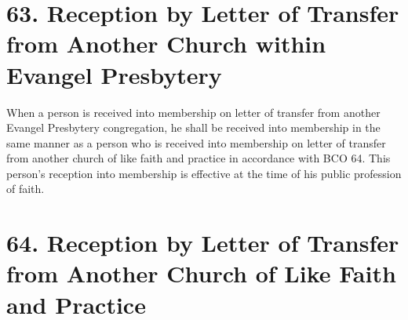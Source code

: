 \documentclass[
]{book}
\begin{document}
\hypertarget{reception-by-letter-of-transfer-from-another-church-within-evangel-presbytery}{%
\section*{63. Reception by Letter of Transfer from Another Church within Evangel Presbytery}\label{reception-by-letter-of-transfer-from-another-church-within-evangel-presbytery}}

\protect\hypertarget{chapter-slug-63-reception-by-letter-of-transfer-from-another-church-within-evangel-presbytery}{\href{}{}}

\protect\hypertarget{63}{\href{}{}}When a person is received into membership on letter of transfer from another Evangel Presbytery congregation, he shall be received into membership in the same manner as a person who is received into membership on letter of transfer from another church of like faith and practice in accordance with BCO 64. This person's reception into membership is effective at the time of his public profession of faith.

\hypertarget{reception-by-letter-of-transfer-from-another-church-of-like-faith-and-practice}{%
\section*{64. Reception by Letter of Transfer from Another Church of Like Faith and Practice}\label{reception-by-letter-of-transfer-from-another-church-of-like-faith-and-practice}}

\protect\hypertarget{chapter-slug-64-reception-by-letter-of-transfer-from-another-church-of-like-faith-and-practice}{\href{}{}}
\end{document}
